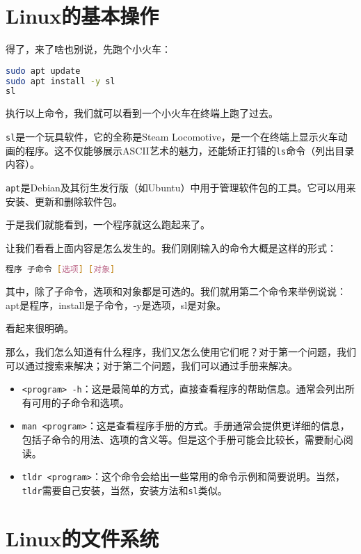 \section{Linux的基本操作}

得了，来了啥也别说，先跑个小火车：

\begin{lstlisting}[language=bash]
sudo apt update
sudo apt install -y sl
sl
\end{lstlisting}

执行以上命令，我们就可以看到一个小火车在终端上跑了过去。

\texttt{sl}是一个玩具软件，它的全称是Steam Locomotive，是一个在终端上显示火车动画的程序。这不仅能够展示ASCII艺术的魅力，还能矫正打错的\texttt{ls}命令（列出目录内容）。

\texttt{apt}是Debian及其衍生发行版（如Ubuntu）中用于管理软件包的工具。它可以用来安装、更新和删除软件包。

于是我们就能看到，一个程序就这么跑起来了。

让我们看看上面内容是怎么发生的。我们刚刚输入的命令大概是这样的形式：
\begin{lstlisting}[language=bash]
程序 子命令 [选项] [对象]
\end{lstlisting}

其中，除了子命令，选项和对象都是可选的。我们就用第二个命令来举例说说：apt是程序，install是子命令，-y是选项，sl是对象。

看起来很明确。

那么，我们怎么知道有什么程序，我们又怎么使用它们呢？对于第一个问题，我们可以通过搜索来解决；对于第二个问题，我们可以通过手册来解决。

\begin{itemize}
  \item \texttt{<program> -h}：这是最简单的方式，直接查看程序的帮助信息。通常会列出所有可用的子命令和选项。
  \item \texttt{man <program>}：这是查看程序手册的方式。手册通常会提供更详细的信息，包括子命令的用法、选项的含义等。但是这个手册可能会比较长，需要耐心阅读。
  \item \texttt{tldr <program>}：这个命令会给出一些常用的命令示例和简要说明。当然，\texttt{tldr}需要自己安装，当然，安装方法和\texttt{sl}类似。
\end{itemize}

\section{Linux的文件系统}


